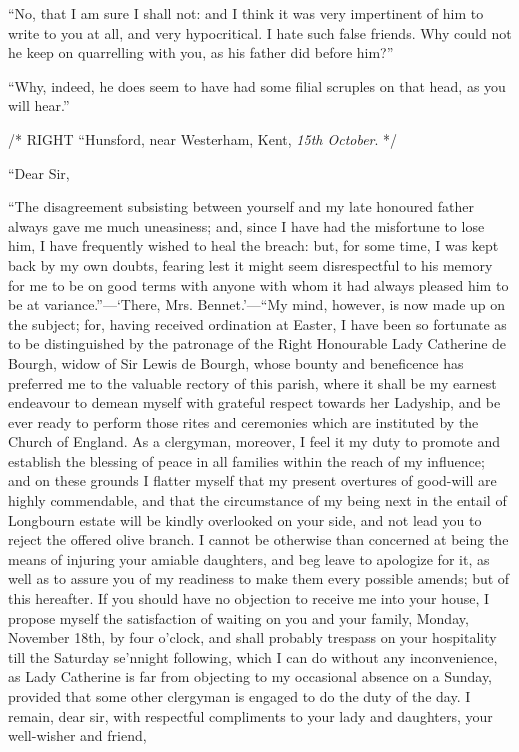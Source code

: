 ``No, that I am sure I shall not: and I think it was very impertinent of him to write to you at all, and very hypocritical. I hate such false friends. Why could not he keep on quarrelling with you, as his father did before him?''

``Why, indeed, he does seem to have had some filial scruples on that head, as you will hear.''

/* RIGHT ``Hunsford, near Westerham, Kent, \textit{15th October}. */

``Dear Sir,

``The disagreement subsisting between yourself and my late honoured father always gave me much uneasiness; and, since I have had the misfortune to lose him, I have frequently wished to heal the breach: but, for some time, I was kept back by my own doubts, fearing lest it might seem disrespectful to his memory for me to be on good terms with anyone with whom it had always pleased him to be at variance.''---`There, Mrs. Bennet.'---``My mind, however, is now made up on the subject; for, having received ordination at Easter, I have been so fortunate as to be distinguished by the patronage of the Right Honourable Lady Catherine de Bourgh, widow of Sir Lewis de Bourgh, whose bounty and beneficence has preferred me to the valuable rectory of this parish, where it shall be my earnest endeavour to demean myself with grateful respect towards her Ladyship, and be ever ready to perform those rites and ceremonies which are instituted by the Church of England. As a clergyman, moreover, I feel it my duty to promote and establish the blessing of peace in all families within the reach of my influence; and on these grounds I flatter myself that my present overtures of good-will are highly commendable, and that the circumstance of my being next in the entail of Longbourn estate will be kindly overlooked on your side, and not lead you to reject the offered olive branch. I cannot be otherwise than concerned at being the means of injuring your amiable daughters, and beg leave to apologize for it, as well as to assure you of my readiness to make them every possible amends; but of this hereafter. If you should have no objection to receive me into your house, I propose myself the satisfaction of waiting on you and your family, Monday, November 18th, by four o'clock, and shall probably trespass on your hospitality till the Saturday se'nnight following, which I can do without any inconvenience, as Lady Catherine is far from objecting to my occasional absence on a Sunday, provided that some other clergyman is engaged to do the duty of the day. I remain, dear sir, with respectful compliments to your lady and daughters, your well-wisher and friend,

